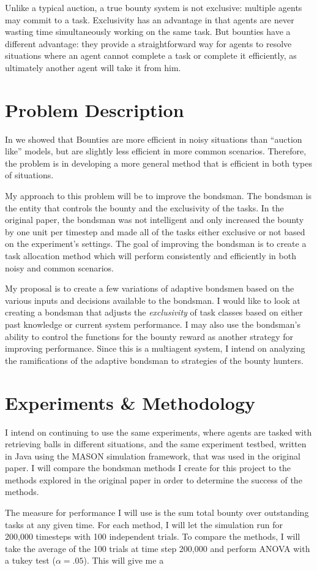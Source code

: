 \documentclass[twocolumn]{article}
\begin{document}
Unlike a typical auction, a true bounty system is not exclusive: multiple agents may commit to a task.  Exclusivity has an advantage in that agents are never wasting time simultaneously working on the same task.  But bounties have a different advantage: they provide a straightforward way for agents to resolve situations where an agent cannot complete a task or complete it efficiently, as ultimately another agent will take it from him. 
\vspace{-1em}
\section{Problem Description}
In \cite{wicke:2015} we showed that Bounties are more efficient in noisy situations than ``auction like'' models, but are slightly less efficient in more common scenarios.  Therefore, the problem is in developing a more general method that is efficient in both types of situations.  

My approach to this problem will be to improve the bondsman.  The bondsman is the entity that controls the bounty and the exclusivity of the tasks.  In the original paper, the bondsman was not intelligent and only increased the bounty by one unit per timestep and made all of the tasks either exclusive or not based on the experiment's settings.  The goal of improving the bondsman is to create a task allocation method which will perform consistently and efficiently in both noisy and common scenarios.

My proposal is to create a few variations of adaptive bondsmen based on the various inputs and decisions available to the bondsman.  I would like to look at creating a bondsman that adjusts the {\it exclusivity} of task classes based on either past knowledge or current system performance.  I may also use the bondsman's ability to control the functions for the bounty reward as another strategy for improving performance.  Since this is a multiagent system, I intend on analyzing the ramifications of the adaptive bondsman to strategies of the bounty hunters.
\vspace{-1em}
\section{Experiments \& Methodology}
I intend on continuing to use the same experiments, where agents are tasked with retrieving balls in different situations, and the same experiment testbed, written in Java using the MASON simulation framework, that was used in the original paper.  I will compare the bondsman methods I create for this project to the methods explored in the original paper in order to determine the success of the methods.

The measure for performance I will use is the sum total bounty over outstanding tasks at any given time.  For each method, I will let the simulation run for 200,000 timesteps with 100 independent trials.  To compare the methods, I will take the average of the 100 trials at time step 200,000 and perform ANOVA with a tukey test (\(\alpha = .05\)).  This will give me a 

\vspace{-0.5em}


\end{document}
